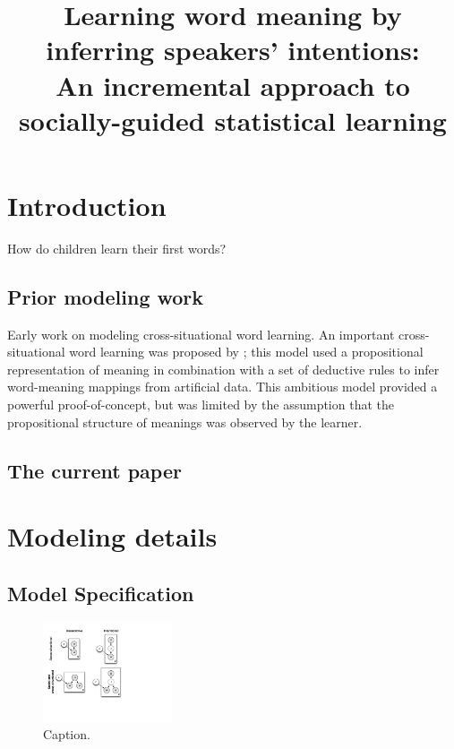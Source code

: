 \documentclass[man,noapacite]{apa2}
\title{Learning word meaning by inferring speakers' intentions: \\ An incremental approach to socially-guided statistical learning}
\begin{document}
\maketitle                            


\section{Introduction}

How do children learn their first words? 


\subsection{Prior modeling work}

Early work on modeling cross-situational word learning. 
An important cross-situational word learning was proposed by ; this model used a propositional representation of meaning in combination with a set of deductive rules to infer word-meaning mappings from artificial data. This ambitious model provided a powerful proof-of-concept, but was limited by the assumption that the propositional structure of meanings was observed by the learner. 

\subsection{The current paper}


\section{Modeling details}

\subsection{Model Specification}
\begin{figure}[tr]
\begin{center}
\includegraphics[width=1.5in]{figures/gen_mod.pdf}
\caption{\label{fig:genmod} Caption.}
\end{center}
\end{figure}
\end{document}
